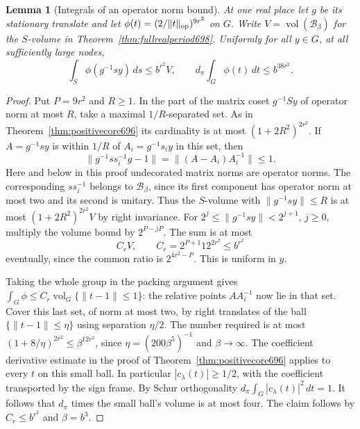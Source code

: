 \documentclass[a4paper,11pt]{article}
\newtheorem{lemma}[proposition]{Lemma}
\theoremstyle{definition}
\theoremstyle{remark}
\numberwithin{equation}{section}
\begin{document}
\begin{lemma}[Integrals of an operator norm bound]\leavevmode
\label{lem:cosetpacking699}
At one real place let \(g\) be its stationary translate and
let \(\phi(t)=(2/\|t\|_{\rm op})^{9r^2}\) on \(G\). Write
\(V=\operatorname{vol}(\mathcal B_\beta)\) for the \(S\)-volume
in Theorem~\ref{thm:fullrealperiod698}. Uniformly for all
\(y\in G\), at all sufficiently large nodes,
\[
  \int_S\phi(g^{-1}sy)\,ds\le b^{r^2}V,\qquad
  d_\pi\int_G\phi(t)\,dt\le b^{38r^2}.
\]
\end{lemma}
\begin{proof}
Put \(P=9r^2\) and \(R\ge1\). In the part of the matrix
coset \(g^{-1}Sy\) of operator norm at most \(R\), take
a maximal \(1/R\)-separated set. As in
Theorem~\ref{thm:positivecore696} its cardinality is at
most \((1+2R^2)^{2r^2}\). If \(A=g^{-1}sy\) is within
\(1/R\) of \(A_i=g^{-1}s_i y\) in this set, then
\[
   \|g^{-1}s s_i^{-1}g-1\|
       =\|(A-A_i)A_i^{-1}\|\le1 .
\]
Here and below in this proof undecorated matrix norms are
operator norms. The corresponding \(s s_i^{-1}\) belongs
to \(\mathcal B_\beta\), since its first component has
operator norm at most two and its second is unitary.
Thus the \(S\)-volume with \(\|g^{-1}sy\|\le R\) is at
most \((1+2R^2)^{2r^2}V\) by right invariance. For
\(2^j\le\|g^{-1}sy\|<2^{j+1}\), \(j\ge0\), multiply the
volume bound by \(2^{P-jP}\). The sum is at most
\[
       C_r V,\qquad C_r=2^{P+1}12^{2r^2}\le b^{r^2}
\]
eventually, since the common ratio is \(2^{4r^2-P}\).
This is uniform in \(y\).

Taking the whole group in the packing argument gives
\(\int_G\phi\le C_r\operatorname{vol}_G\{\|t-1\|\le1\}\):
the relative points \(AA_i^{-1}\) now lie in that set.
Cover this last set, of norm at most two, by right
translates of the ball \(\{\|t-1\|\le\eta\}\) using
separation \(\eta/2\). The number required is at most
\((1+8/\eta)^{2r^2}\le\beta^{12r^2}\), since
\(\eta=(200\beta^5)^{-1}\) and \(\beta\to\infty\).
The coefficient derivative estimate in the proof of
Theorem~\ref{thm:positivecore696} applies to every \(t\)
on this small ball. In particular \(|c_\lambda(t)|\ge1/2\),
with the coefficient transported by the sign frame.
By Schur orthogonality \(d_\pi\int_G|c_\lambda(t)|^2\,dt=1\).
It follows that \(d_\pi\) times the small ball's volume
is at most four. The claim follows by \(C_r\le b^{r^2}\)
and \(\beta=b^3\).
\end{proof}
\end{document}
